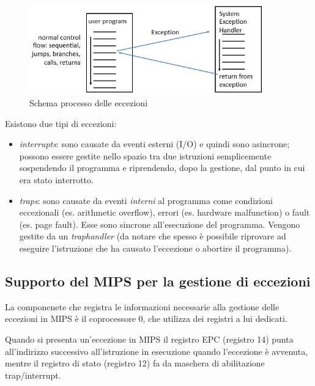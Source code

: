\documentclass[class=book, crop=false, oneside]{standalone}
\begin{document}
\begin{figure}[!h]
	\centering
	\includegraphics[width=0.9\textwidth,keepaspectratio]{schema-eccezioni}
	\caption{Schema processo delle eccezioni}
\end{figure}
Esistono due tipi di eccezioni:
\begin{itemize}
	\item \emph{interrupts}: sono causate da eventi esterni (I/O) e quindi sono asincrone; possono essere gestite nello spazio tra due istruzioni semplicemente sospendendo il programma e riprendendo, dopo la gestione, dal punto in cui era stato interrotto.
	\item \emph{traps}: sono causate da eventi \emph{interni} al programma come condizioni eccezionali (es. arithmetic overflow), errori (es. hardware malfunction) o fault (es. page fault). Esse sono sincrone all'esecuzione del programma. Vengono gestite da un \emph{traphandler} (da notare che spesso è possibile riprovare ad eseguire l'istruzione che ha causato l'eccezione o abortire il programma).
\end{itemize}

\subsection{Supporto del MIPS per la gestione di eccezioni}
La componenete che registra le informazioni necessarie alla gestione delle eccezioni in MIPS è il coprocessore 0, che utilizza dei registri a lui dedicati.

Quando si presenta un'eccezione in MIPS il registro EPC (registro 14) punta all'indirizzo successivo all'istruzione in esecuzione quando l'eccezione è avvenuta, mentre il registro di stato (registro 12) fa da maschera di abilitazione trap/interrupt.
\end{document}
